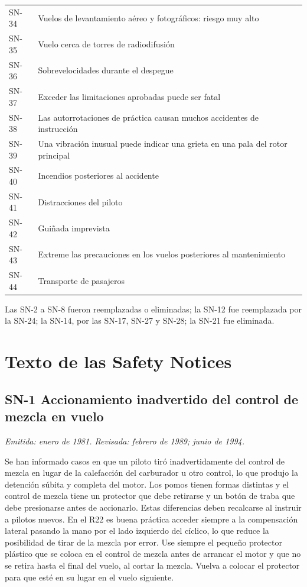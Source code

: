 \begin{longtable}{@{}lp{\dimexpr\linewidth-1.4cm-2\tabcolsep}@{}}
SN-34 & Vuelos de levantamiento aéreo y fotográficos: riesgo muy alto \\
SN-35 & Vuelo cerca de torres de radiodifusión \\
SN-36 & Sobrevelocidades durante el despegue \\
SN-37 & Exceder las limitaciones aprobadas puede ser fatal \\
SN-38 & Las autorrotaciones de práctica causan muchos accidentes de instrucción \\
SN-39 & Una vibración inusual puede indicar una grieta en una pala del rotor principal \\
SN-40 & Incendios posteriores al accidente \\
SN-41 & Distracciones del piloto \\
SN-42 & Guiñada imprevista \\
SN-43 & Extreme las precauciones en los vuelos posteriores al mantenimiento \\
SN-44 & Transporte de pasajeros \\
\bottomrule
\end{longtable}

Las SN-2 a SN-8 fueron reemplazadas o eliminadas; la SN-12 fue reemplazada por la SN-24; la SN-14, por las SN-17, SN-27 y SN-28; la SN-21 fue eliminada.

\section{Texto de las Safety Notices}

\subsection*{SN-1 \quad Accionamiento inadvertido del control de mezcla en vuelo}
{\small\textit{Emitida: enero de 1981. Revisada: febrero de 1989; junio de 1994.}}

Se han informado casos en que un piloto tiró inadvertidamente del control de mezcla en lugar de la calefacción del carburador u otro control, lo que produjo la detención súbita y completa del motor. Los pomos tienen formas distintas y el control de mezcla tiene un protector que debe retirarse y un botón de traba que debe presionarse antes de accionarlo. Estas diferencias deben recalcarse al instruir a pilotos nuevos. En el R22 es buena práctica acceder siempre a la compensación lateral pasando la mano por el lado izquierdo del cíclico, lo que reduce la posibilidad de tirar de la mezcla por error. Use siempre el pequeño protector plástico que se coloca en el control de mezcla antes de arrancar el motor y que no se retira hasta el final del vuelo, al cortar la mezcla. Vuelva a colocar el protector para que esté en su lugar en el vuelo siguiente.


